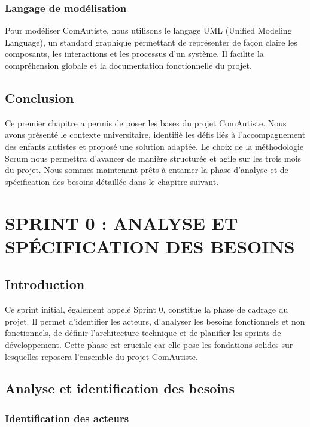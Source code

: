 \documentclass[12pt,a4paper]{report}
\begin{document}
\subsection{Langage de modélisation}

Pour modéliser ComAutiste, nous utilisons le langage UML (Unified Modeling Language), un standard graphique permettant de représenter de façon claire les composants, les interactions et les processus d'un système. Il facilite la compréhension globale et la documentation fonctionnelle du projet.

\section{Conclusion}

Ce premier chapitre a permis de poser les bases du projet ComAutiste. Nous avons présenté le contexte universitaire, identifié les défis liés à l'accompagnement des enfants autistes et proposé une solution adaptée. Le choix de la méthodologie Scrum nous permettra d'avancer de manière structurée et agile sur les trois mois du projet. Nous sommes maintenant prêts à entamer la phase d'analyse et de spécification des besoins détaillée dans le chapitre suivant.

\newpage

\chapter{SPRINT 0 : ANALYSE ET SPÉCIFICATION DES BESOINS}

\section{Introduction}

Ce sprint initial, également appelé Sprint 0, constitue la phase de cadrage du projet. Il permet d'identifier les acteurs, d'analyser les besoins fonctionnels et non fonctionnels, de définir l'architecture technique et de planifier les sprints de développement. Cette phase est cruciale car elle pose les fondations solides sur lesquelles reposera l'ensemble du projet ComAutiste.

\section{Analyse et identification des besoins}

\subsection{Identification des acteurs}
\end{document}
